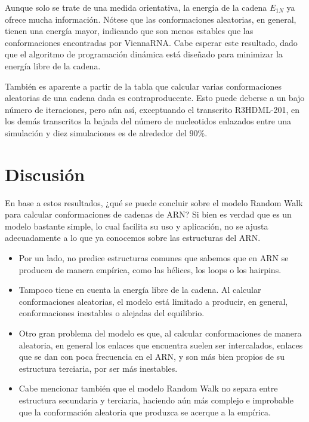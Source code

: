 \documentclass[a4paper,11pt,titlepage]{article}
\theoremstyle{definition}
\begin{document}
Aunque solo se trate de una medida orientativa, la energía de la cadena $E_{1N}$ ya ofrece mucha información. Nótese que las conformaciones aleatorias, en general, tienen una energía mayor, indicando que son menos estables que las conformaciones encontradas por ViennaRNA. Cabe esperar este resultado, dado que el algoritmo de programación dinámica está diseñado para minimizar la energía libre de la cadena.

También es aparente a partir de la tabla que calcular varias conformaciones aleatorias de una cadena dada es contraproducente. Esto puede deberse a un bajo número de iteraciones, pero aún así, exceptuando el transcrito R3HDML-201, en los demás transcritos la bajada del número de nucleotidos enlazados entre una simulación y diez simulaciones es de alrededor del $90\%$.


\section{Discusión}\label{sec:cnc}

En base a estos resultados, ¿qué se puede concluir sobre el modelo Random Walk para calcular conformaciones de cadenas de ARN? Si bien es verdad que es un modelo bastante simple, lo cual facilita su uso y aplicación, no se ajusta adecuadamente a lo que ya conocemos sobre las estructuras del ARN.

\begin{itemize}
    \item Por un lado, no predice estructuras comunes que sabemos que en ARN se producen de manera empírica, como las hélices, los loops o los hairpins.
    \item Tampoco tiene en cuenta la energía libre de la cadena. Al calcular conformaciones aleatorias, el modelo está limitado a producir, en general, conformaciones inestables o alejadas del equilibrio.
    \item Otro gran problema del modelo es que, al calcular conformaciones de manera aleatoria, en general los enlaces que encuentra suelen ser intercalados, enlaces que se dan con poca frecuencia en el ARN, y son más bien propios de su estructura terciaria, por ser más inestables.
    \item Cabe mencionar también que el modelo Random Walk no separa entre estructura secundaria y terciaria, haciendo aún más complejo e improbable que la conformación aleatoria que produzca se acerque a la empírica.
\end{itemize}
\end{document}
